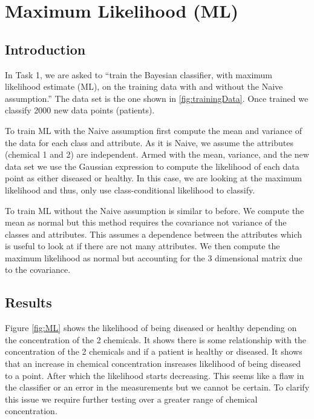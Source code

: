


\section{Maximum Likelihood (ML)}{\label{s1}
	
\subsection{Introduction}\label{Int}
In Task 1, we are asked to ``train the Bayesian classifier, with maximum likelihood estimate (ML), on the training data with and without the Naive assumption.'' The data set is the one shown in \ref{fig:trainingData}. Once trained we classify 2000 new data points (patients).

To train ML with the Naive assumption first compute the mean and variance of the data for each class and attribute. As it is Naive, we assume the attributes (chemical 1 and 2) are independent. Armed with the mean, variance, and the new data set we use the Gaussian expression to compute the likelihood of each data point as either diseased or healthy. In this case, we are looking at the maximum likelihood and thus, only use class-conditional likelihood to classify. 

To train ML without the Naive assumption is similar to before. We compute the mean as normal but this method requires the covariance not variance of the classes and attributes. This assumes a dependence between the attributes which is useful to look at if there are not many attributes. We then compute the maximum likelihood as normal but accounting for the 3 dimensional matrix due to the covariance.

\subsection{Results}\label{CVcons}
 Figure \ref{fig:ML} shows the likelihood of being diseased or healthy depending on the concentration of the 2 chemicals. It shows there is some relationship with the concentration of the 2 chemicals and if a patient is healthy or diseased.  It shows that an increase in chemical concentration insreases likelihood of being diseased to a point. After which the likelihood starts decreasing. This seems like a flaw in the classifier or an error in the measurements but we cannot be certain. To clarify this issue we require further testing over a greater range of chemical concentration.
 
}
